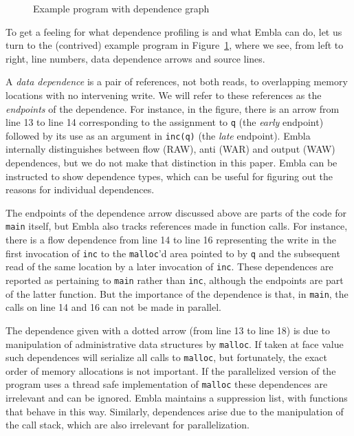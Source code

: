 \documentclass[times, 10pt,twocolumn]{article}
\begin{document}
\begin{figure} 
\small

\caption{Example program with dependence graph} \label{ffirstex}
\end{figure}

To get a feeling for what dependence profiling is and what Embla can do, 
let us turn to the (contrived) example program in Figure~\ref{ffirstex},
where we see, from left to right, line numbers, data dependence 
arrows and source lines. 

A {\em data dependence} is a pair
of references, not both reads, to overlapping memory
locations with no intervening write. We will refer to these
references as the {\em endpoints} of the dependence.
For instance, in the figure, 
there is an arrow from line 13 to line 14 corresponding to
the assignment to {\tt q} (the {\em early} endpoint) followed by its use 
as an argument in {\tt inc(q)} (the {\em late} endpoint). Embla
internally distinguishes between flow (RAW), anti (WAR) and output (WAW) 
dependences, but we do not make that distinction in this paper. Embla 
can be instructed to show dependence types, which can be
useful for figuring out the reasons for individual dependences.

The endpoints of the dependence arrow discussed above are parts of
the code for {\tt main} itself, but Embla also tracks references made 
in function calls. For
instance, there is a flow dependence from line 14 to line 16
representing the write in the first invocation of {\tt inc} to the 
{\tt malloc}'d area pointed to by {\tt q} and the subsequent read 
of the same location by a later invocation of {\tt inc}. 
These dependences 
are reported as pertaining to {\tt main} rather than {\tt inc},
although the endpoints are part of the latter function. 
But the importance of the dependence is that, in {\tt main}, the calls
on line 14 and 16 can not be made in parallel.

The dependence given with a dotted arrow 
(from line 13 to line 18) is due to manipulation of administrative 
data structures by {\tt malloc}. If taken at face value such dependences will
serialize all calls to {\tt malloc}, but fortunately, the exact order
of memory allocations is not important. If the 
parallelized version of the program uses a thread safe 
implementation of {\tt malloc} these dependences are irrelevant and
can be ignored. Embla maintains a suppression list, with functions that behave 
in this way.  Similarly, dependences arise due to the
manipulation of the call stack, which are also irrelevant for parallelization.
\end{document}
